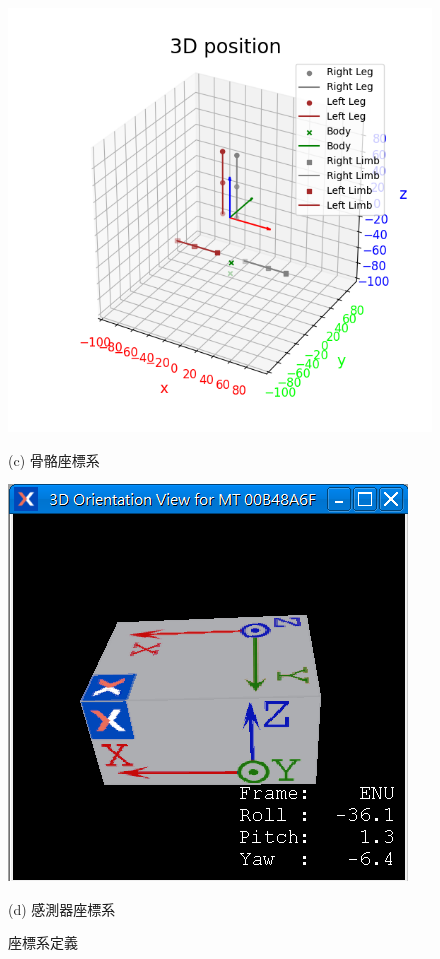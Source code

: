 \begin{figure}[!ht]
\begin{minipage}{.5\textwidth}
     \includegraphics[width=.95\linewidth]{figure/ch3_fig_skeleton_frame.png}
     \caption*{(c) 骨骼座標系}
   \end{minipage}%
   \begin{minipage}{.5\textwidth}
     \centering
     \includegraphics[width=.95\linewidth]{figure/ch3_fig_imu_frame.png}
     \caption*{(d) 感測器座標系}
   \end{minipage}
   \captionsetup{justification=centering}
   \caption[座標系定義]{座標系定義}
   \label{ch3_fig_frame}
\end{figure}

